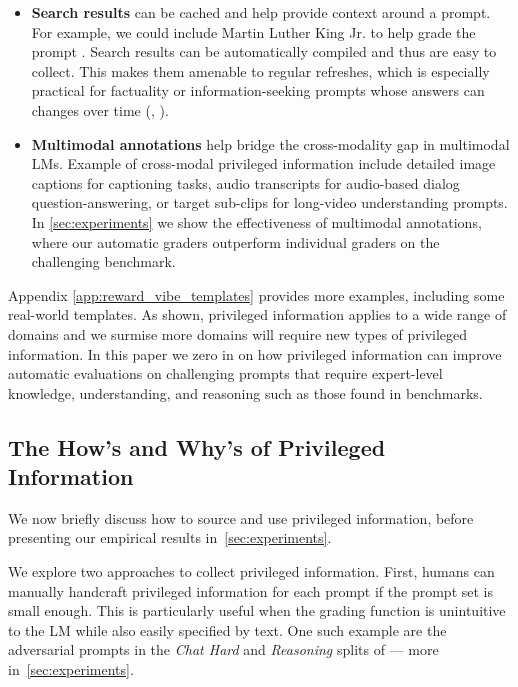 \begin{itemize}
    \item \textbf{Search results} can be cached and help provide context around a prompt.
    For example, we could include Martin Luther King Jr. to help grade the prompt .
    Search results can be automatically compiled and thus are easy to collect.
    This makes them amenable to regular refreshes, which is especially practical for factuality or information-seeking prompts whose answers can changes over time (\eg, ).

    \item \textbf{Multimodal annotations} help bridge the cross-modality gap in multimodal LMs.
    Example of cross-modal privileged information include detailed image captions for captioning tasks, audio transcripts for audio-based dialog question-answering, or target sub-clips for long-video understanding prompts.
    In \cref{sec:experiments} we show the effectiveness of multimodal annotations, where our automatic graders outperform individual graders on the challenging \VibeEval benchmark.
\end{itemize}
%
Appendix \ref{app:reward_vibe_templates} provides more examples, including some real-world templates.
As shown, privileged information applies to a wide range of domains and we surmise more domains will require new types of privileged information.
In this paper we zero in on how privileged information can improve automatic evaluations on challenging prompts that require expert-level knowledge, understanding, and reasoning such as those found in \NS benchmarks.

\subsection{The How's and Why's of Privileged Information}
\label{sec:method-grader}

We now briefly discuss how to source and use privileged information, before presenting our empirical results in~\cref{sec:experiments}.

We explore two approaches to collect privileged information.
First, humans can manually handcraft privileged information for each prompt if the prompt set is small enough.
This is particularly useful when the grading function is unintuitive to the LM while also easily specified by text.
One such example are the adversarial prompts in the \emph{Chat Hard} and \emph{Reasoning} splits of \RewardBench --- more in~\cref{sec:experiments}.

